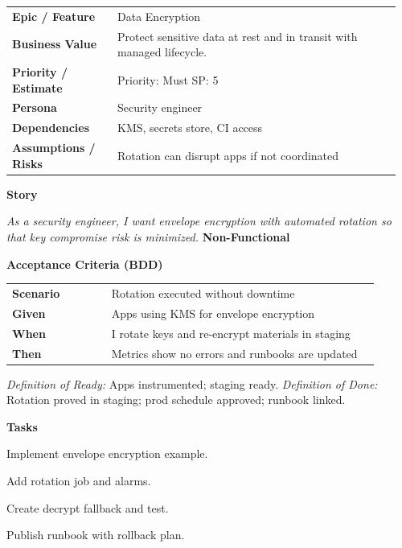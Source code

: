 \documentclass[11pt,letterpaper]{article}
\makeatletter
\newenvironment{kvtable}{%
  \begin{tabular}{@{}>{\bfseries\arraybackslash}p{0.26\linewidth} p{0.70\linewidth}@{}}
}{\end{tabular}}
\newenvironment{bdd}{%
  \begin{tabular}{@{}>{\bfseries\arraybackslash}p{0.26\linewidth} p{0.70\linewidth}@{}}
}{\end{tabular}}
\newcommand{\DoRDoD}[2]{%
  \vspace{0.35em}
  {\footnotesize\color{Muted}%
    \textit{Definition of Ready:} #1 \; \textbullet\;
    \textit{Definition of Done:} #2%
  }%
}
\newenvironment{storycard}[2]{%
  \begin{tcolorbox}[cloudcard, title={#1 --- #2}]%
}{\end{tcolorbox}}
\newcommand{\sectionlabel}[1]{\vspace{0.35em}\textbf{#1}\par}
\makeatother
\begin{document}
\begin{storycard}{CCS-11}{Ch. 11 — Cryptographic Key Management}
\begin{kvtable}
Epic / Feature & Data Encryption\\
Business Value & Protect sensitive data at rest and in transit with managed lifecycle.\\
Priority / Estimate & Priority: Must \quad SP: 5\\
Persona & Security engineer\\
Dependencies & KMS, secrets store, CI access\\
Assumptions / Risks & Rotation can disrupt apps if not coordinated\\
\end{kvtable}
\sectionlabel{Story}
\textit{As a security engineer, I want envelope encryption with automated rotation so that key compromise risk is minimized.}
\sectionlabel{Non-Functional}\;\;
\sectionlabel{Acceptance Criteria (BDD)}
\begin{bdd}
Scenario & Rotation executed without downtime\\
Given & Apps using KMS for envelope encryption\\
When & I rotate keys and re-encrypt materials in staging\\
Then & Metrics show no errors and runbooks are updated\\
\end{bdd}
\DoRDoD{Apps instrumented; staging ready.}{Rotation proved in staging; prod schedule approved; runbook linked.}
\sectionlabel{Tasks}
\begin{checklist}
\item Implement envelope encryption example.
\item Add rotation job and alarms.
\item Create decrypt fallback and test.
\item Publish runbook with rollback plan.
\end{checklist}
\end{storycard}
\end{document}
